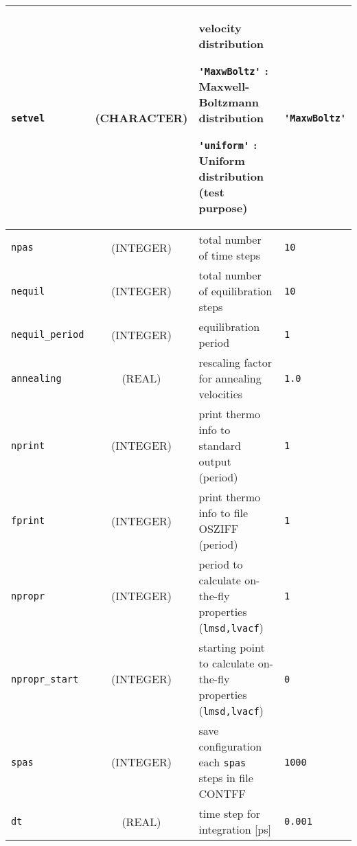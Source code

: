 \documentclass[a4paper,8pt]{article}
\begin{document}
\begin{longtable}{l|c|m{8cm}|m{2cm}}
\hline
\rule[-0.75cm]{0cm}{1.5cm}
\verb?setvel?    & (CHARACTER)        &  \newline velocity distribution \newline 
                                        
					 \verb?'MaxwBoltz'? : Maxwell-Boltzmann distribution \newline 

					 \verb?'uniform'?   : Uniform distribution (test purpose) \newline                  & \verb?'MaxwBoltz'? \tabularnewline
\hline
\rule[-0.75cm]{0cm}{1.5cm}
\verb?npas?      & (INTEGER)          &  total number of time steps                                                         & \verb?10?    \\
\hline
\rule[-0.75cm]{0cm}{1.5cm}
\verb?nequil?    & (INTEGER)          &  total number of equilibration steps                                                & \verb?10? \\
\hline
\rule[-0.75cm]{0cm}{1.5cm}
\verb?nequil_period? 
                 & (INTEGER)          &  equilibration period                                                               & \verb?1? \\
\hline
\rule[-0.75cm]{0cm}{1.5cm}
\verb?annealing? & (REAL)             &  rescaling factor for annealing velocities                                          & \verb?1.0? \\
\hline
\rule[-0.75cm]{0cm}{1.5cm}
\verb?nprint?    & (INTEGER)          &  print thermo info to standard output (period)                                      & \verb?1? \\
\hline
\rule[-0.75cm]{0cm}{1.5cm}
\verb?fprint?    & (INTEGER)          &  print thermo info to file OSZIFF (period)                                          & \verb?1? \\
\hline
\rule[-0.75cm]{0cm}{1.5cm}
\verb?npropr?    & (INTEGER)          &  period to calculate on-the-fly properties (\verb?lmsd,lvacf?)                      & \verb?1? \\
\hline
\rule[-0.75cm]{0cm}{1.5cm}
\verb?npropr_start?   
                 & (INTEGER)          &  starting point to calculate on-the-fly properties (\verb?lmsd,lvacf?)              & \verb?0? \\
\hline
\rule[-0.75cm]{0cm}{1.5cm}
\verb?spas?      & (INTEGER)          &  save configuration each \verb?spas? steps in file CONTFF                           & \verb?1000? \\
\hline
\rule[-0.75cm]{0cm}{1.5cm}
\verb?dt?        & (REAL)             &  time step for integration [ps]                                                     & \verb?0.001? \\

\end{longtable}
\end{document}
